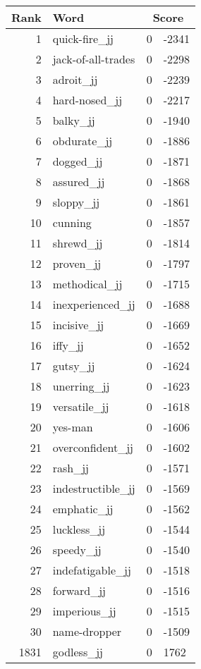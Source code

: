 \begin{longtable}[!htbp]{| rlr@{.}l |}
    \hline
    \textbf{Rank} & \textbf{Word} & \multicolumn{2}{c|}{\textbf{Score}} \\
    \hline
    \endhead
    1 & quick-fire\_jj & 0 & -2341 \\
    2 & jack-of-all-trades & 0 & -2298 \\
    3 & adroit\_jj & 0 & -2239 \\
    4 & hard-nosed\_jj & 0 & -2217 \\
    5 & balky\_jj & 0 & -1940 \\
    6 & obdurate\_jj & 0 & -1886 \\
    7 & dogged\_jj & 0 & -1871 \\
    8 & assured\_jj & 0 & -1868 \\
    9 & sloppy\_jj & 0 & -1861 \\
    10 & cunning & 0 & -1857 \\
    11 & shrewd\_jj & 0 & -1814 \\
    12 & proven\_jj & 0 & -1797 \\
    13 & methodical\_jj & 0 & -1715 \\
    14 & inexperienced\_jj & 0 & -1688 \\
    15 & incisive\_jj & 0 & -1669 \\
    16 & iffy\_jj & 0 & -1652 \\
    17 & gutsy\_jj & 0 & -1624 \\
    18 & unerring\_jj & 0 & -1623 \\
    19 & versatile\_jj & 0 & -1618 \\
    20 & yes-man & 0 & -1606 \\
    21 & overconfident\_jj & 0 & -1602 \\
    22 & rash\_jj & 0 & -1571 \\
    23 & indestructible\_jj & 0 & -1569 \\
    24 & emphatic\_jj & 0 & -1562 \\
    25 & luckless\_jj & 0 & -1544 \\
    26 & speedy\_jj & 0 & -1540 \\
    27 & indefatigable\_jj & 0 & -1518 \\
    28 & forward\_jj & 0 & -1516 \\
    29 & imperious\_jj & 0 & -1515 \\
    30 & name-dropper & 0 & -1509 \\
    1831 & godless\_jj & 0 & 1762 \\

\end{longtable}
